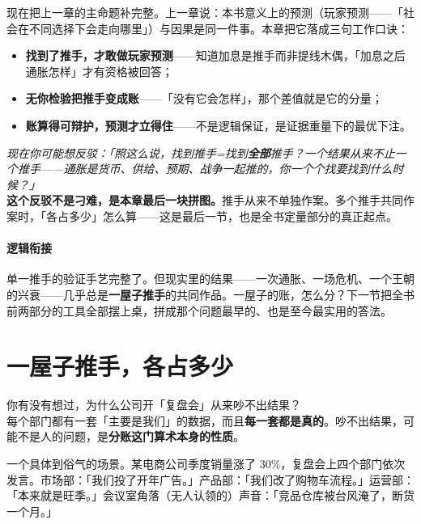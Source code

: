\documentclass[../../main2.tex]{subfiles}
\begin{document}
	现在把上一章的主命题补完整。上一章说：本书意义上的预测（玩家预测——「社会在不同选择下会走向哪里」）与因果是同一件事。本章把它落成三句工作口诀：

	\begin{itemize}
		\item \textbf{找到了推手，才敢做玩家预测}——知道加息是推手而非提线木偶，「加息之后通胀怎样」才有资格被回答；
		\item \textbf{无你检验把推手变成账}——「没有它会怎样」，那个差值就是它的分量；
		\item \textbf{账算得可辩护，预测才立得住}——不是逻辑保证，是证据重量下的最优下注。
	\end{itemize}

	\begin{questionbox}
		\textit{现在你可能想反驳：「照这么说，找到推手=找到\textbf{全部}推手？一个结果从来不止一个推手——通胀是货币、供给、预期、战争一起推的，你一个个找要找到什么时候？」}\\
		\textbf{这个反驳不是刁难，是本章最后一块拼图。}推手从来不单独作案。多个推手共同作案时，「各占多少」怎么算——这是最后一节，也是全书定量部分的真正起点。
	\end{questionbox}

	\paragraph*{逻辑衔接}
	单一推手的验证手艺完整了。但现实里的结果——一次通胀、一场危机、一个王朝的兴衰——几乎总是\textbf{一屋子推手}的共同作品。一屋子的账，怎么分？下一节把全书前两部分的工具全部摆上桌，拼成那个问题最早的、也是至今最实用的答法。

	\section{一屋子推手，各占多少}
	\label{sec:contrib-multi}

	\begin{readingnote}
		你有没有想过，为什么公司开「复盘会」从来吵不出结果？\\
		每个部门都有一套「主要是我们」的数据，而且\textbf{每一套都是真的}。吵不出结果，可能不是人的问题，是\textbf{分账这门算术本身的性质}。
	\end{readingnote}

	一个具体到俗气的场景。某电商公司季度销量涨了 30\%，复盘会上四个部门依次发言。市场部：「我们投了开年广告。」产品部：「我们改了购物车流程。」运营部：「本来就是旺季。」会议室角落（无人认领的）声音：「竞品仓库被台风淹了，断货一个月。」
\end{document}
